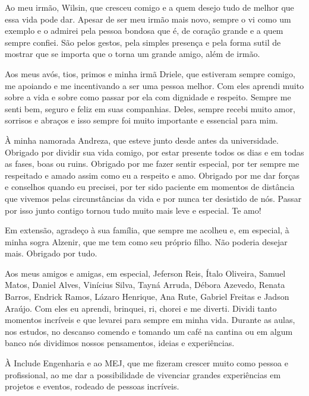 \begin{trivlist}
  \item Ao meu irmão, Wilsin, que cresceu comigo e a quem desejo tudo de melhor que essa vida pode dar. Apesar de ser meu irmão mais novo, sempre o vi como um exemplo e o admirei pela pessoa bondosa que é, de coração grande e a quem sempre confiei. São pelos gestos, pela simples presença e pela forma sutil de mostrar que se importa que o torna um grande amigo, além de irmão.

  \item Aos meus avós, tios, primos e minha irmã Driele, que estiveram sempre comigo, me apoiando e me incentivando a ser uma pessoa melhor. Com eles aprendi muito sobre a vida e sobre como passar por ela com dignidade e respeito. Sempre me senti bem, seguro e feliz em suas companhias. Deles, sempre recebi muito amor, sorrisos e abraços e isso sempre foi muito importante e essencial para mim.

  \item À minha namorada Andreza, que esteve junto desde antes da universidade. Obrigado por dividir sua vida comigo, por estar presente todos os dias e em todas as fases, boas ou ruins. Obrigado por me fazer sentir especial, por ter sempre me respeitado e amado assim como eu a respeito e amo. Obrigado por me dar forças e conselhos quando eu precisei, por ter sido paciente em momentos de distância que vivemos pelas circunstâncias da vida e por nunca ter desistido de nós. Passar por isso junto contigo tornou tudo muito mais leve e especial. Te amo!

  \item Em extensão, agradeço à sua família, que sempre me acolheu e, em especial, à minha sogra Alzenir, que me tem como seu próprio filho. Não poderia desejar mais. Obrigado por tudo.
  
  \item Aos meus amigos e amigas, em especial, Jeferson Reis, Ítalo Oliveira, Samuel Matos, Daniel Alves, Vinícius Silva, Tayná Arruda, Débora Azevedo, Renata Barros, Endrick Ramos, Lázaro Henrique, Ana Rute, Gabriel Freitas e Jadson Araújo. Com eles eu aprendi, brinquei, ri, chorei e me diverti. Dividi tanto momentos incríveis e que levarei para sempre em minha vida. Durante as aulas, nos estudos, no descanso comendo e tomando um café na cantina ou em algum banco nós dividimos nossos pensamentos, ideias e experiências.

  \item À Include Engenharia e ao MEJ, que me fizeram crescer muito como pessoa e profissional, ao me dar a possibilidade de vivenciar grandes experiências em projetos e eventos, rodeado de pessoas incríveis.


\end{trivlist}
